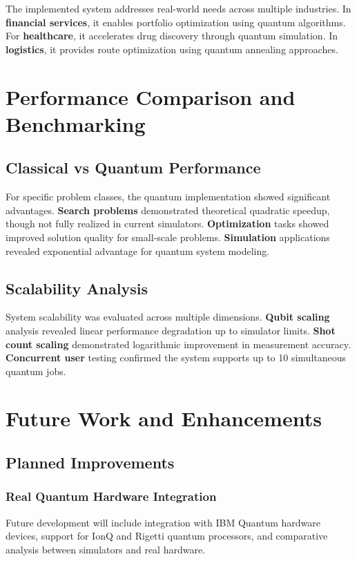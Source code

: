 \documentclass[onecolumn]{IEEEtran}
\begin{document}
The implemented system addresses real-world needs across multiple industries. In \textbf{financial services}, it enables portfolio optimization using quantum algorithms. For \textbf{healthcare}, it accelerates drug discovery through quantum simulation. In \textbf{logistics}, it provides route optimization using quantum annealing approaches.

\section{Performance Comparison and Benchmarking}

\subsection{Classical vs Quantum Performance}

For specific problem classes, the quantum implementation showed significant advantages. \textbf{Search problems} demonstrated theoretical quadratic speedup, though not fully realized in current simulators. \textbf{Optimization} tasks showed improved solution quality for small-scale problems. \textbf{Simulation} applications revealed exponential advantage for quantum system modeling.

\subsection{Scalability Analysis}

System scalability was evaluated across multiple dimensions. \textbf{Qubit scaling} analysis revealed linear performance degradation up to simulator limits. \textbf{Shot count scaling} demonstrated logarithmic improvement in measurement accuracy. \textbf{Concurrent user} testing confirmed the system supports up to 10 simultaneous quantum jobs.

\section{Future Work and Enhancements}

\subsection{Planned Improvements}

\subsubsection{Real Quantum Hardware Integration}
Future development will include integration with IBM Quantum hardware devices, support for IonQ and Rigetti quantum processors, and comparative analysis between simulators and real hardware.
\end{document}
